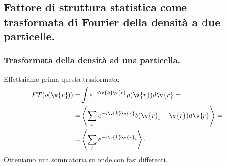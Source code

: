 \subsection{Fattore di struttura statistica come trasformata di Fourier della densità a due particelle.}
\label{subsec:Fattore di struttura statistica come trasformata di Fourier della densità a due particelle.}
\subsubsection{Trasformata della densità ad una particella.}
\label{subsubsec:Trasformata della densità ad una particella.}
Effettuiamo prima questa trasformata:
\[\begin{aligned}
	FT(\rho (\v{r})) =&
	\int e^{-i \v{k}\v{r}}\rho (\v{r})d \v{r} =\\
	=&
	\left<\sum_{i}^{} e^{-i \v{k}\v{r}} \delta(\v{r}_i -\v{r})d \v{r} \right> =\\
	=&
	\left<\sum_{i}^{} e^{-i \v{k}\v{r}_i} \right>
.\end{aligned}\]
Otteniamo una sommatoria su onde con fasi differenti.
